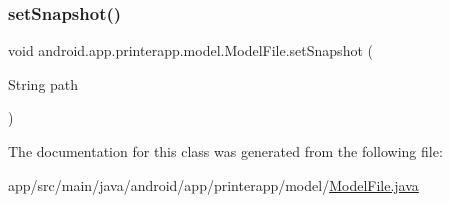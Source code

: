 \subsubsection{\texorpdfstring{set\+Snapshot()}{setSnapshot()}}
{\footnotesize\ttfamily void android.\+app.\+printerapp.\+model.\+Model\+File.\+set\+Snapshot (\begin{DoxyParamCaption}\item[{String}]{path }\end{DoxyParamCaption})}



The documentation for this class was generated from the following file\+:\begin{DoxyCompactItemize}
\item 
app/src/main/java/android/app/printerapp/model/\hyperlink{_model_file_8java}{Model\+File.\+java}\end{DoxyCompactItemize}
